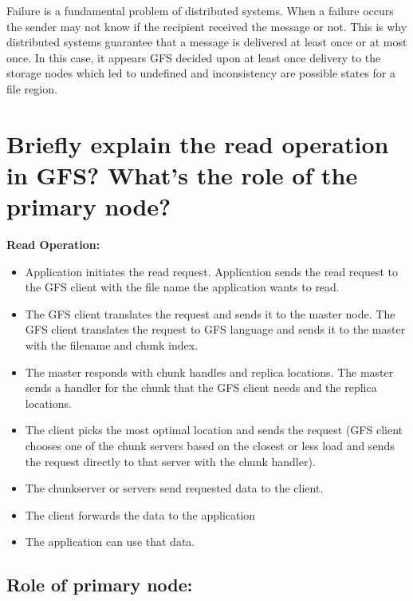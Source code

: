 \documentclass{article}
\begin{document}
Failure is a fundamental problem of distributed systems. When a failure occurs the sender may not know if the recipient received the message or not. This is why distributed systems guarantee that a message is delivered at least once or at most once. In this case, it appears GFS decided upon at least once delivery to the storage nodes which led to undefined and inconsistency are possible states for a file region. 


\section{Briefly explain the read operation in GFS? What’s the role of the primary node?}

\textbf{Read Operation:}

\begin{itemize}
    \item Application initiates  the read request. Application sends the read request to the GFS client with the file name the application wants to read.
\item The GFS client translates the request and sends it to the master node. The GFS client translates the request to GFS language and sends it to the master with the filename and chunk index.
\item The master responds with chunk handles and replica locations. The master sends a handler for the chunk that the GFS client needs and the replica locations. 
\item The client picks the most optimal location and sends the request (GFS client chooses one of the chunk servers based on the closest or less load and sends the request directly to that server with the chunk handler).
\item The chunkserver or servers send requested data to the client.
\item The client forwards the data to the application
\item The application can use that data.
\end{itemize}

\subsection*{\textbf{Role of primary node:}}
\end{document}
